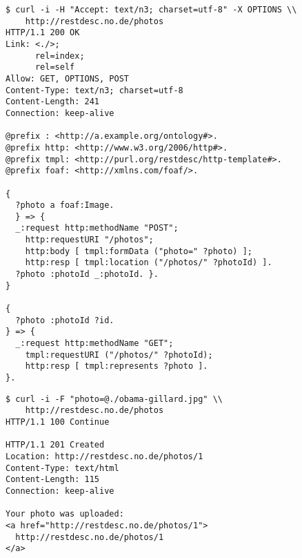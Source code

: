 \documentclass[runningheads,a4paper, twocolumn]{llncs}
\begin{document}
\begin{figure}[float=h!]
\begin{lstlisting}[caption=Listing showing an OPTIONS call on a discovered index path from an API's base URI while accepting text/n3 responses., label=lst:PhotosOPTIONS, escapechar=§]
$ curl -i -H "Accept: text/n3; charset=utf-8" -X OPTIONS \\
    http://restdesc.no.de/photos
HTTP/1.1 200 OK
Link: <./>;
      rel=index;
      rel=self
Allow: GET, OPTIONS, POST      
Content-Type: text/n3; charset=utf-8
Content-Length: 241
Connection: keep-alive

@prefix : <http://a.example.org/ontology#>.
@prefix http: <http://www.w3.org/2006/http#>.
@prefix tmpl: <http://purl.org/restdesc/http-template#>.
@prefix foaf: <http://xmlns.com/foaf/>.

{
  ?photo a foaf:Image.
  } => {
  _:request http:methodName "POST";
    http:requestURI "/photos";
    http:body [ tmpl:formData ("photo=" ?photo) ];
    http:resp [ tmpl:location ("/photos/" ?photoId) ].
  ?photo :photoId _:photoId. }.
}

{
  ?photo :photoId ?id.
} => {
  _:request http:methodName "GET";
    tmpl:requestURI ("/photos/" ?photoId);
    http:resp [ tmpl:represents ?photo ].
}.
\end{lstlisting}
\end{figure}

\begin{figure}[float=h!]
\begin{lstlisting}[caption=Listing showing a POST call in order to upload a photo discovered via the Notation3 data from the previous request., label=lst:PhotoPOST, escapechar=§]
$ curl -i -F "photo=@./obama-gillard.jpg" \\
    http://restdesc.no.de/photos
HTTP/1.1 100 Continue

HTTP/1.1 201 Created
Location: http://restdesc.no.de/photos/1
Content-Type: text/html
Content-Length: 115
Connection: keep-alive

Your photo was uploaded:
<a href="http://restdesc.no.de/photos/1">
  http://restdesc.no.de/photos/1
</a>
\end{lstlisting}
\end{figure}
\end{document}
